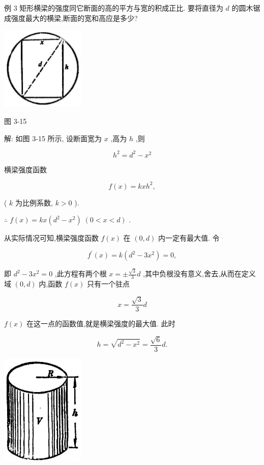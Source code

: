 \documentclass[lang=cn,newtx,10pt,scheme=chinese]{elegantbook}
\begin{document}
例 3 矩形横梁的强度同它断面的高的平方与宽的积成正比. 要将直径为 \(d\) 的圆木锯成强度最大的横梁,断面的宽和高应是多少?

\begin{center}
\includegraphics[max width=0.3\textwidth]{images/01912c18-5c3f-733d-b775-749ba9897a9d_150_941467.jpg}
\end{center}

图 3-15

解: 如图 3-15 所示, 设断面宽为 \(x\) ,高为 \(h\) ,则

\[
{h}^{2} = {d}^{2} - {x}^{2}
\]

横梁强度函数

\[
f\left( x\right) = {kx}{h}^{2},
\]

( \(k\) 为比例系数, \(k > 0\) ).

\(\therefore \;f\left( x\right) = {kx}\left( {{d}^{2} - {x}^{2}}\right) \;\left( {0 < x < d}\right)\) .

从实际情况可知,横梁强度函数 \(f\left( x\right)\) 在 \(\left( {0,d}\right)\) 内一定有最大值. 令

\[
{f}^{\prime }\left( x\right) = k\left( {{d}^{2} - 3{x}^{2}}\right) = 0,
\]

即 \({d}^{2} - 3{x}^{2} = 0\) ,此方程有两个根 \(x = \pm \frac{\sqrt{3}}{3}d\) ,其中负根没有意义,舍去,从而在定义域 \(\left( {0,d}\right)\) 内,函数 \(f\left( x\right)\) 只有一个驻点

\[
x = \frac{\sqrt{3}}{3}d
\]

\(f\left( x\right)\) 在这一点的函数值,就是横梁强度的最大值. 此时

\[
h = \sqrt{{d}^{2} - {x}^{2}} = \frac{\sqrt{6}}{3}d.
\]

\begin{center}
\includegraphics[max width=0.3\textwidth]{images/01912c18-5c3f-733d-b775-749ba9897a9d_150_751406.jpg}
\end{center}
\end{document}
